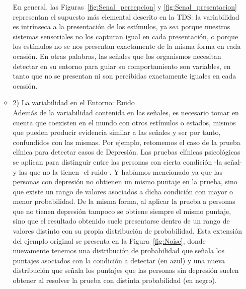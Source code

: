 \begin{itemize}
\begin{itemize}
En general, las Figuras~\ref{fig:Senal_percepcion} y \ref{fig:Senal_presentacion} representan el supuesto más elemental descrito en la TDS: la variabilidad es intrínseca a la presentación de los estímulos, ya sea porque nuestros sistemas sensoriales no los capturan igual en cada presentación, o porque los estímulos no se nos presentan exactamente de la misma forma en cada ocasión. En otras palabras, las señales que los organismos necesitan detectar en su entorno para guiar su comportamiento son variables, en tanto que no se presentan ni son percibidas exactamente iguales en cada ocasión.\\

      \item{2) La variabilidad en el Entorno: Ruido}\\

Además de la variabilidad contenida en las señales, es necesario tomar en cuenta que coexisten en el mundo con otros estímulos o estados, mismos que pueden producir evidencia similar a las señales y ser por tanto, confundidos con las mismas. Por ejemplo, retomemos el caso de la prueba clínica para detectar casos de Depresión. Las pruebas clínicas psicológicas se aplican para distinguir entre las personas con cierta condición -la señal- y las que no la tienen -el ruido-. Y habíamos mencionado ya que las personas con depresión no obtienen un mismo puntaje en la prueba, sino que existe un rango de valores asociados a dicha condición con mayor o menor probabilidad. De la misma forma, al aplicar la prueba a personas que no tienen depresión tampoco se obtiene siempre el mismo puntaje, sino que el resultado obtenido suele presentarse dentro de un rango de valores distinto con su propia distribución de probabilidad. Esta extensión del ejemplo original se presenta en la Figura~\ref{fig:Noise}, donde nuevamente tenemos una distribución de probabilidad que señala los puntajes asociados con la condición a detectar (en azul) y una nueva distribución que señala los puntajes que las personas sin depresión suelen obtener al resolver la prueba con distinta probabilidad (en negro).\\


\end{itemize}
\end{itemize}

